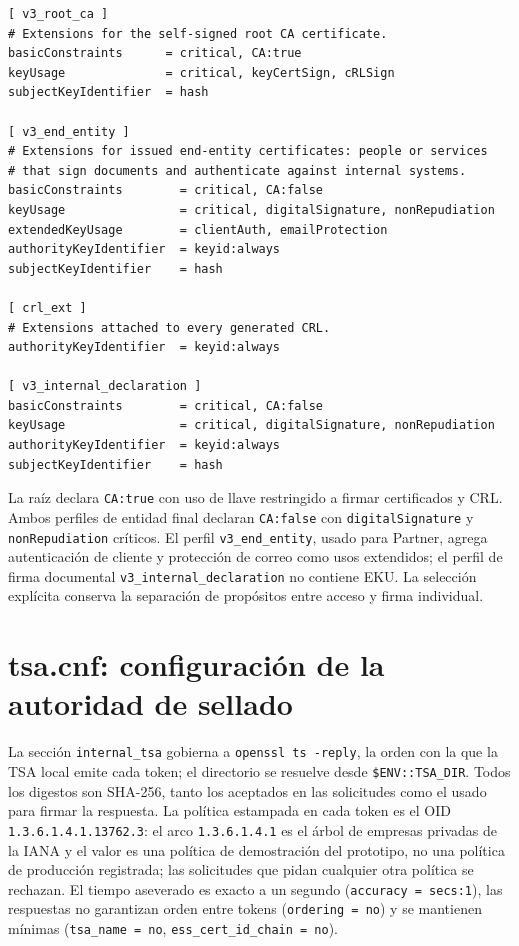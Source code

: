 \begin{lstlisting}[language={}, float=htbp, caption={Extensiones X.509 v3 definidas en \texttt{pki/openssl.cnf}.}, label={lst:pki-extensiones}]
[ v3_root_ca ]
# Extensions for the self-signed root CA certificate.
basicConstraints      = critical, CA:true
keyUsage              = critical, keyCertSign, cRLSign
subjectKeyIdentifier  = hash

[ v3_end_entity ]
# Extensions for issued end-entity certificates: people or services
# that sign documents and authenticate against internal systems.
basicConstraints        = critical, CA:false
keyUsage                = critical, digitalSignature, nonRepudiation
extendedKeyUsage        = clientAuth, emailProtection
authorityKeyIdentifier  = keyid:always
subjectKeyIdentifier    = hash

[ crl_ext ]
# Extensions attached to every generated CRL.
authorityKeyIdentifier  = keyid:always

[ v3_internal_declaration ]
basicConstraints        = critical, CA:false
keyUsage                = critical, digitalSignature, nonRepudiation
authorityKeyIdentifier  = keyid:always
subjectKeyIdentifier    = hash
\end{lstlisting}

La ra\'iz declara \texttt{CA:true} con uso de llave restringido a firmar
certificados y CRL. Ambos perfiles de entidad final declaran \texttt{CA:false}
con \texttt{digitalSignature} y \texttt{nonRepudiation} cr\'iticos. El perfil
\texttt{v3\_end\_entity}, usado para Partner, agrega autenticaci\'on de cliente
y protecci\'on de correo como usos extendidos; el perfil de firma documental
\texttt{v3\_internal\_declaration} no contiene EKU. La selecci\'on expl\'icita
conserva la separaci\'on de prop\'ositos entre acceso y firma individual.

\section{tsa.cnf: configuración de la autoridad de sellado}\label{sec:pki-tsa-cnf}

La sección \texttt{internal\_tsa} gobierna a \texttt{openssl ts -reply}, la orden con la que la TSA local emite cada token; el directorio se resuelve desde \texttt{\$ENV::TSA\_DIR}. Todos los digestos son SHA-256, tanto los aceptados en las solicitudes como el usado para firmar la respuesta. La política estampada en cada token es el OID \texttt{1.3.6.1.4.1.13762.3}: el arco \texttt{1.3.6.1.4.1} es el árbol de empresas privadas de la IANA y el valor es una política de demostración del prototipo, no una política de producción registrada; las solicitudes que pidan cualquier otra política se rechazan. El tiempo aseverado es exacto a un segundo (\texttt{accuracy = secs:1}), las respuestas no garantizan orden entre tokens (\texttt{ordering = no}) y se mantienen mínimas (\texttt{tsa\_name = no}, \texttt{ess\_cert\_id\_chain = no}).

